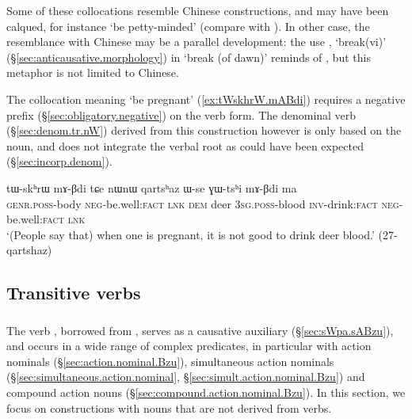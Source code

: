 Some of these collocations resemble Chinese constructions, and may have been calqued, for instance  `be petty-minded' (compare with ). In other case, the resemblance with Chinese may be a parallel development: the use , `break(vi)' (§\ref{sec:anticausative.morphology}) in  `break (of dawn)' reminds of , but this metaphor is not limited to Chinese.

The collocation meaning  `be pregnant' (\ref{ex:tWskhrW.mABdi}) requires a negative prefix (§\ref{sec:obligatory.negative}) on the verb form. The denominal verb   (§\ref{sec:denom.tr.nW}) derived from this construction however is only based on the noun, and does not integrate the verbal root as could have been expected (§\ref{sec:incorp.denom}).

 \begin{exe}
\ex \label{ex:tWskhrW.mABdi}
\gll tɯ-skʰrɯ mɤ-βdi tɕe nɯnɯ qartsʰaz ɯ-se ɣɯ-tsʰi mɤ-βdi ma \\
\textsc{genr}.\textsc{poss}-body \textsc{neg}-be.well:\textsc{fact} \textsc{lnk} \textsc{dem} deer \textsc{3sg}.\textsc{poss}-blood \textsc{inv}-drink:\textsc{fact} \textsc{neg}-be.well:\textsc{fact} \textsc{lnk} \\
\glt `(People say that) when one is pregnant, it is not good to drink deer blood.' (27-qartshaz)
\end{exe}


 
\subsection{Transitive verbs}  \label{sec:tr.light.verbs}
\subsubsection{ } \label{sec:Bzu.lv}
The verb , borrowed from , serves as a causative auxiliary (§\ref{sec:sWpa.sABzu}), and occurs in a wide range of complex predicates, in particular with action nominals (§\ref{sec:action.nominal.Bzu}), simultaneous action nominals (§\ref{sec:simultaneous.action.nominal}, §\ref{sec:simult.action.nominal.Bzu}) and compound action nouns (§\ref{sec:compound.action.nominal.Bzu}). In this section, we focus on constructions with nouns that are not derived from verbs.
  
